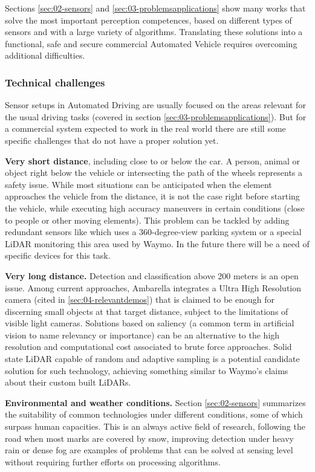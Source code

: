 \documentclass[journal]{IEEEtran}
\begin{document}
Sections \ref{sec:02-sensors} and \ref{sec:03-problemsapplications} show many 
works that solve the most important perception competences, based on different 
types of sensors and with a large variety of algorithms. 
Translating these solutions into a functional, safe and secure commercial 
Automated Vehicle requires overcoming additional difficulties.

\subsubsection{Technical challenges}

Sensor setups in Automated Driving are usually focused on the areas relevant 
for the usual driving tasks (covered in section 
\ref{sec:03-problemsapplications}). 
But for a commercial system expected to work in the real world there are still
some specific challenges that do not have a proper solution yet.

\textbf{Very short distance}, including close to or below the car.
A person, animal or object right below the vehicle or intersecting 
the path of the wheels represents a safety issue. While most situations
can be anticipated when the element approaches the vehicle from the
distance, it is not the case right before starting the vehicle, 
while executing high accuracy maneuvers in certain conditions 
(close to people or other moving elements).  
This problem can be tackled by adding redundant sensors like \cite{gandhi2006vehicle}
which uses a 360-degree-view parking system or a special LiDAR monitoring this area
used by Waymo.    
In the future there will be a need of specific devices for this task.

\textbf{Very long distance.} 
Detection and classification above 200 meters is an open issue. 
Among current approaches, Ambarella integrates a Ultra High Resolution 
camera (cited in \ref{sec:04-relevantdemos}) that is claimed to be enough
for discerning small objects at that target distance, subject to the 
limitations of visible light cameras.    
Solutions based on saliency (a common term in artificial vision 
\cite{Zhang2016a,Palazzi2018,Duthon2016} to name relevancy or importance) 
can be an alternative to the high resolution and computational cost 
associated to brute force approaches. Solid state LiDAR capable of
random and adaptive sampling is a potential candidate solution for such 
technology, achieving something similar to Waymo's claims about their custom
built LiDARs.

\textbf{Environmental and weather conditions.}    
Section \ref{sec:02-sensors} summarizes the suitability of common 
technologies under different conditions, some of which surpass human 
capacities. 
This is an always active field of research, following the road  when
most marks are covered by snow, improving detection under heavy rain 
or dense fog are examples of problems that can be solved at sensing
level without requiring further efforts on processing algorithms.
\end{document}
